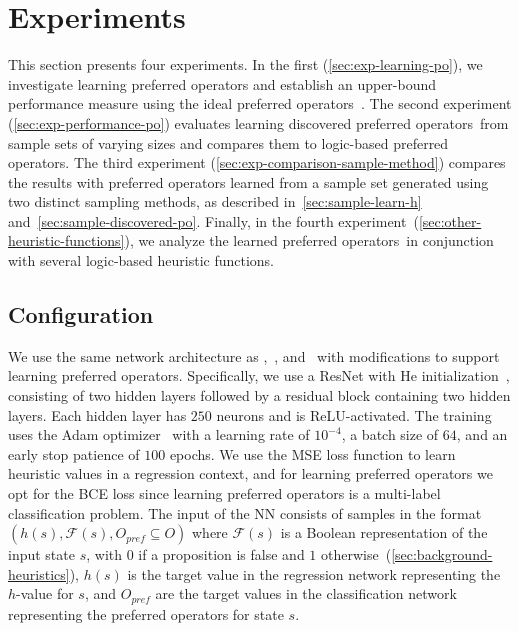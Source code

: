 \documentclass[ppgc,diss,english]{iiufrgs}
\begin{document}
\chapter{Experiments}
\label{cha:exp-experiments}
This section presents four experiments. In the first (\cref{sec:exp-learning-po}), we investigate learning preferred operators and establish an upper-bound performance measure using the ideal preferred operators~\postar. The second experiment (\cref{sec:exp-performance-po}) evaluates learning discovered preferred operators~\pog from sample sets of varying sizes and compares them to logic-based preferred operators. The third experiment (\cref{sec:exp-comparison-sample-method}) compares the results with preferred operators learned from a sample set generated using two distinct sampling methods, as described in~\cref{sec:sample-learn-h} and~\cref{sec:sample-discovered-po}. Finally, in the fourth experiment~(\cref{sec:other-heuristic-functions}), we analyze the learned preferred operators~\pog in conjunction with several logic-based heuristic functions.

\section{Configuration}
\label{sec:exp-configuration}

We use the same network architecture as \citet{Ferber.etal/2022},~\citet{OToole/2022}, and~\citet{Bettker.etal/2022} with modifications to support learning preferred operators. Specifically, we use a ResNet with He initialization~\cite{He.etal/2015}, consisting of two hidden layers followed by a residual block containing two hidden layers.
Each hidden layer has $250$ neurons and is ReLU-activated.
The training uses the Adam optimizer~\cite{Kingma.Ba/2015} with a learning rate of $10^{-4}$, a batch size of $64$, and an early stop patience of $100$ epochs.
We use the MSE loss function to learn heuristic values in a regression context, and for learning preferred operators we opt for the BCE loss since learning preferred operators is a multi-label classification problem.
The input of the NN consists of samples in the format $(h(s), \mathcal{F}(s), O_{pref} \subseteq O)$
where $\mathcal{F}(s)$ is a Boolean representation of the input state $s$, with $0$ if a proposition is false and $1$ otherwise~(\cref{sec:background-heuristics}), $h(s)$ is the target value in the regression network representing the $h$-value for $s$, and $O_{pref}$ are the target values in the classification network representing the preferred operators for state $s$.
\end{document}
